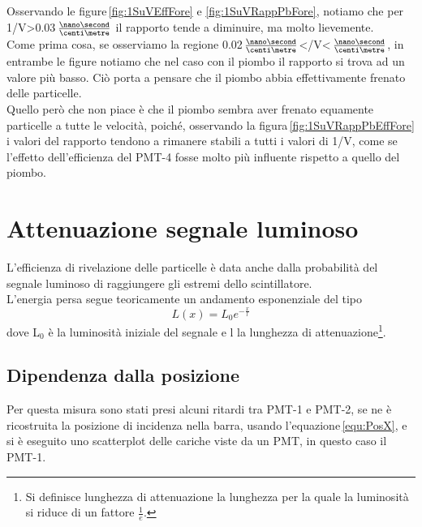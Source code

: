 \documentclass[a4paper,twocolumn]{article}
\begin{document}
Osservando le figure\,\ref{fig:1SuVEffFore} e \ref{fig:1SuVRappPbFore}, notiamo che per 1/V\:>0.03\,$\frac{\nano\second}{\centi\metre}$ il rapporto tende a diminuire, ma molto lievemente.\\
Come prima cosa, se osserviamo la regione 0.02\,$\frac{\nano\second}{\centi\metre}$\:</V\:<\,$\frac{\nano\second}{\centi\metre}$, in entrambe le figure notiamo che nel caso con il piombo il rapporto si trova ad un valore più basso. Ciò porta a pensare che il piombo abbia effettivamente frenato delle particelle.\\
Quello però che non piace è che il piombo sembra aver frenato equamente particelle a tutte le velocità, poiché, osservando la figura\,\ref{fig:1SuVRappPbEffFore} i valori del rapporto tendono a rimanere stabili a tutti i valori di 1/V, come se l'effetto dell'efficienza del PMT-4 fosse molto più influente rispetto a quello del piombo.



\newpage
\section{Attenuazione segnale luminoso}
\label{sec:Atte}
L'efficienza di rivelazione delle particelle è data anche dalla probabilità del segnale luminoso di raggiungere gli estremi dello scintillatore.\\
L'energia persa segue teoricamente un andamento esponenziale del tipo
\begin{equation}
L(x) = L_0e^{-\frac{x}{l}}
\label{equ:AttLuce}
\end{equation}
dove L$_0$ è la luminosità iniziale del segnale e l la lunghezza di attenuazione\footnote{Si definisce lunghezza di attenuazione la lunghezza per la quale la luminosità si riduce di un fattore $\frac{1}{e}$.}.

\subsection{Dipendenza dalla posizione}
\label{sec:AttPos}
Per questa misura sono stati presi alcuni ritardi tra PMT-1 e PMT-2, se ne è ricostruita la posizione di incidenza nella barra, usando l'equazione\,\ref{equ:PosX}, e si è eseguito uno scatterplot delle cariche viste da un PMT, in questo caso il PMT-1.
\end{document}
